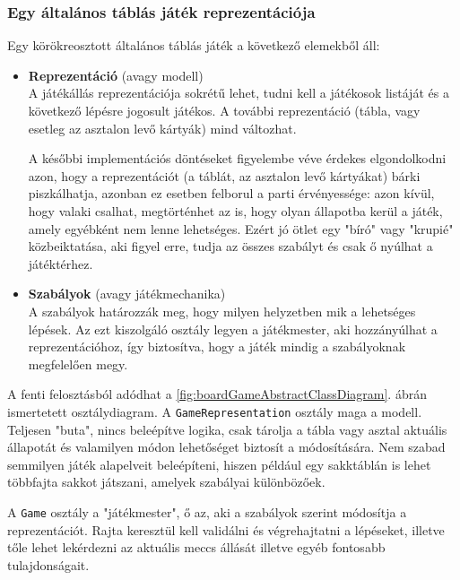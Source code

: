 \documentclass[twoside, a4paper, 12pt]{article}
\begin{document}
\subsubsection{Egy általános táblás játék reprezentációja}

Egy körökreosztott általános táblás játék a következő elemekből áll:

\begin{itemize}
	\item \textbf{Reprezentáció} (avagy modell) \\
	A játékállás reprezentációja sokrétű lehet, tudni kell a játékosok listáját és a következő lépésre jogosult játékos. A további reprezentáció (tábla, vagy esetleg az asztalon levő kártyák) mind változhat.
	
	A későbbi implementációs döntéseket figyelembe véve érdekes elgondolkodni azon, hogy a reprezentációt (a táblát, az asztalon levő kártyákat) bárki piszkálhatja, azonban ez esetben felborul a parti érvényessége: azon kívül, hogy valaki csalhat, megtörténhet az is, hogy olyan állapotba kerül a játék, amely egyébként nem lenne lehetséges. Ezért jó ötlet egy "bíró" vagy "krupié" közbeiktatása, aki figyel erre, tudja az összes szabályt és csak ő nyúlhat a játéktérhez.
	
	\item \textbf{Szabályok} (avagy játékmechanika) \\
	A szabályok határozzák meg, hogy milyen helyzetben mik a lehetséges lépések. Az ezt kiszolgáló osztály legyen a játékmester, aki hozzányúlhat a reprezentációhoz, így biztosítva, hogy a játék mindig a szabályoknak megfelelően megy.
\end{itemize}

A fenti felosztásból adódhat a \ref{fig:boardGameAbstractClassDiagram}. ábrán ismertetett osztálydiagram. A \texttt{GameRepresentation} osztály maga a modell. Teljesen "buta", nincs beleépítve logika, csak tárolja a tábla vagy asztal aktuális állapotát és valamilyen módon lehetőséget biztosít a módosítására. Nem szabad semmilyen játék alapelveit beleépíteni, hiszen például egy sakktáblán is lehet többfajta sakkot játszani, amelyek szabályai különbözőek.

A \texttt{Game} osztály a "játékmester", ő az, aki a szabályok szerint módosítja a reprezentációt. Rajta keresztül kell validálni és végrehajtatni a lépéseket, illetve tőle lehet lekérdezni az aktuális meccs állását illetve egyéb fontosabb tulajdonságait.
\end{document}
